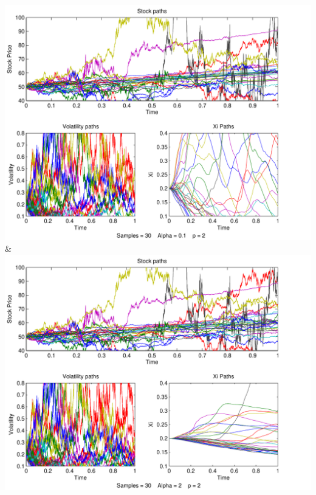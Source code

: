 \documentclass[a4paper,onecolumn,draft]{IEEEtran}
\begin{document}
{		 \includegraphics[width=\stockplotsize]{path_s30_a0-1_p2}&
			\includegraphics[width=\stockplotsize]{path_s30_a2_p2}\LL
			}
\end{document}
